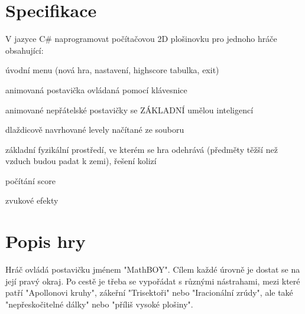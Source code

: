 \documentclass[a4paper,12pt,final]{article}
\begin{document}

\tableofcontents %

\newpage %

\section{Specifikace} %

V jazyce C\# naprogramovat počítačovou 2D plošinovku pro jednoho hráče obsahující:
\begin{compactitem}
	\item úvodní menu (nová hra, nastavení, highscore tabulka, exit) 
	\item animovaná postavička ovládaná pomocí klávesnice
	\item animované nepřátelské postavičky se ZÁKLADNÍ umělou inteligencí 
	\item dlaždicově navrhované levely načítané ze souboru
	\item základní fyzikální prostředí, ve kterém se hra odehrává (předměty těžší než vzduch budou padat k zemi), řešení kolizí 
	\item počítání score
	\item zvukové efekty
\end{compactitem}


\section{Popis hry} %

Hráč ovládá postavičku jménem "MathBOY". Cílem každé úrovně je dostat se na její pravý okraj. Po cestě je třeba se vypořádat s různými nástrahami, mezi které patří "Apollonovi kruhy", zákeřní "Trisektoři" nebo "Iracionální zrúdy", ale také "nepřeskočitelné dálky" nebo "příliš vysoké plošiny".
\end{document}
